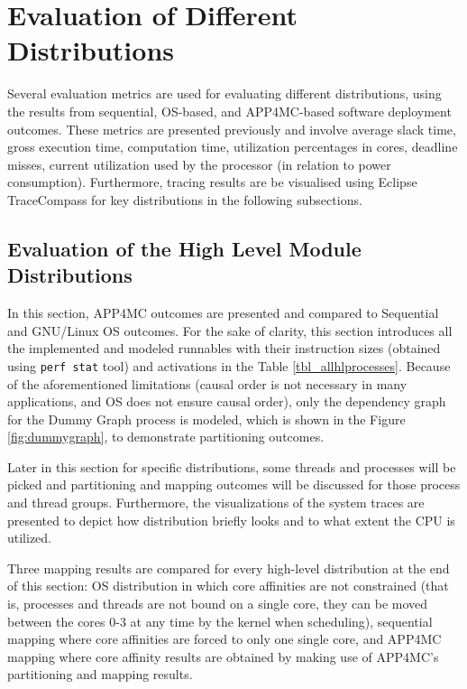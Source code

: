 
\section{Evaluation of Different Distributions}
Several evaluation metrics are used for evaluating different distributions, using the results from sequential, OS-based, and APP4MC-based software deployment outcomes. These metrics are presented previously and involve average slack time, gross execution time, computation time, utilization percentages in cores, deadline misses, current utilization used by the processor (in relation to power consumption). Furthermore, tracing results are be visualised using Eclipse TraceCompass for key distributions in the following subsections.

\subsection{Evaluation of the High Level Module Distributions}
In this section, APP4MC outcomes are presented and compared to Sequential and GNU/Linux OS outcomes. For the sake of clarity, this section introduces all the implemented and modeled runnables with their instruction sizes (obtained using \texttt{perf stat} tool) and activations in the Table \ref{tbl_allhlprocesses}. Because of the aforementioned limitations (causal order is not necessary in many applications, and OS does not ensure causal order), only the dependency graph for the Dummy Graph process is modeled,  which is shown in the Figure \ref{fig:dummygraph}, to demonstrate partitioning outcomes.

Later in this section for specific distributions, some threads and processes will be picked and partitioning and mapping outcomes will be discussed for those process and thread groups. Furthermore, the visualizations of the system traces are presented to depict how distribution briefly looks and to what extent the CPU is utilized.

Three mapping results are compared for every high-level distribution at the end of this section: OS distribution in which core affinities are not constrained (that is, processes and threads are not bound on a single core, they can be moved between the cores 0-3 at any time by the kernel when scheduling), sequential mapping where core affinities are forced to only one single core, and APP4MC mapping where core affinity results are obtained by making use of APP4MC's partitioning and mapping results. 

